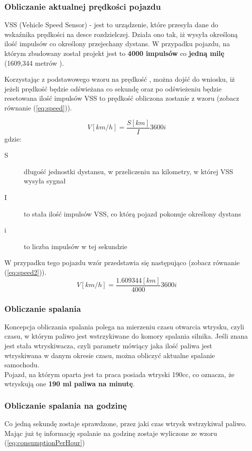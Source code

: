 \subsubsection{Obliczanie aktualnej prędkości pojazdu} \label{calc_speed}
VSS (Vehicle Speed Sensor) - jest to urządzenie, które przesyła dane do wskaźnika prędkości na desce rozdzielczej. Działa ono tak, iż wysyła określoną ilość impulsów co określony przejechany dystans. W przypadku pojazdu, na którym zbudowany został projekt jest to \textbf{4000 impulsów} co \textbf{jedną milę} (1609,344 metrów \cite{mila}).
\par Korzystając z podstawowego wzoru na prędkość \cite{fizyka}, można dojść do wniosku, iż jeżeli prędkość będzie odświeżana co sekundę oraz po odświeżeniu będzie resetowana ilość impulsów VSS to prędkość obliczona zostanie z wzoru (zobacz równanie (\ref{eq:speed})).

\begin{equation}\label{eq:speed}
V[km/h] = \frac{S[km]}{I} 3600 i
\end{equation}
gdzie:
\begin{description}
\item[S] długość jednostki dystansu, w przeliczeniu na kilometry, w której VSS wysyła sygnał
\item[I] to stała ilość impulsów VSS, co którą pojazd pokonuje określony dystans
\item[i] to liczba impulsów w tej sekundzie
\end{description}
W przypadku tego pojazdu wzór przedstawia się następująco (zobacz równanie (\ref{eq:speed2})).
\begin{equation}\label{eq:speed2}
V[km/h] = \frac{1.609344[km]}{4000} 3600i
\end{equation}

\subsubsection{Obliczanie spalania} \label{calc_consumption}
Koncepcja obliczania spalania polega na mierzeniu czasu otwarcia wtrysku, czyli czasu, w którym paliwo jest wstrzykiwane do komory spalania silnika. Jeśli znana jest stała wtryskiwacza, czyli parametr mówiący jaka ilość paliwa jest wtryskiwana w danym okresie czasu, można obliczyć aktualne spalanie samochodu.\\
Pojazd, na którym oparta jest ta praca posiada wtryski 190cc, co oznacza, że wtryskują one \textbf{190 ml paliwa na minutę}.

\subsubsection{Obliczanie spalania na godzinę}
Co jedną sekundę zostaje sprawdzone, przez jaki czas wtrysk wstrzykiwał paliwo. Mając już tę informację spalanie na godzinę zostaje wyliczone ze wzoru (\ref{eq:consumptionPerHour})

